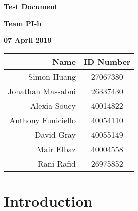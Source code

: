 \documentclass[12pt]{article}
\begin{document}
\vspace*{0.5in}
\centerline{\bf\Large Test Document}

\vspace*{0.5in}
\centerline{\bf\Large Team PI-b}

\vspace*{0.5in}
\centerline{\bf\Large 07 April 2019}

\vspace*{1.5in}
\begin{table}[htbp]
\begin{center}
\begin{tabular}{|r | c|}
\hline
Name & ID Number \\
\hline\hline
Simon Huang & 27067380 \\
\hline
Jonathan Massabni & 26337430 \\
\hline
Alexia Soucy & 40014822 \\
\hline
Anthony Funiciello& 40054110\\
\hline
David Gray&40055149\\
\hline
Mair Elbaz&40004558\\
\hline
Rani Rafid&26975852\\
\hline
\end{tabular}
\end{center}
\end{table}

\clearpage

\section{Introduction}
\end{document}

